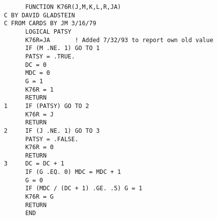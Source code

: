 \begin{frame}[fragile]
    \begin{verbatim}
            FUNCTION K76R(J,M,K,L,R,JA)
      C BY DAVID GLADSTEIN
      C FROM CARDS BY JM 3/16/79
            LOGICAL PATSY
            K76R=JA       ! Added 7/32/93 to report own old value
            IF (M .NE. 1) GO TO 1
            PATSY = .TRUE.
            DC = 0
            MDC = 0
            G = 1
            K76R = 1
            RETURN
      1     IF (PATSY) GO TO 2
            K76R = J
            RETURN
      2     IF (J .NE. 1) GO TO 3
            PATSY = .FALSE.
            K76R = 0
            RETURN
      3     DC = DC + 1
            IF (G .EQ. 0) MDC = MDC + 1
            G = 0
            IF (MDC / (DC + 1) .GE. .5) G = 1
            K76R = G
            RETURN
            END
    \end{verbatim}
\end{frame}
